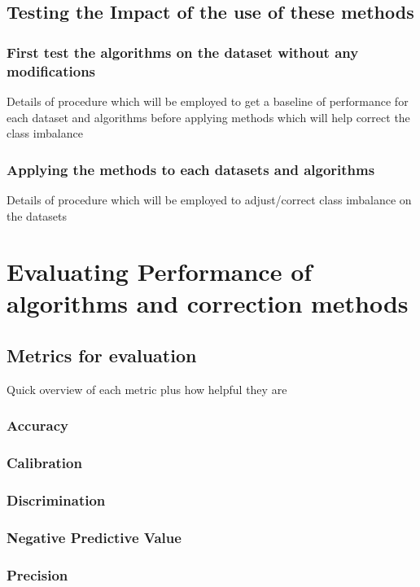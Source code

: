 \subsection{Testing the Impact of the use of these methods}
\subsubsection{First test the algorithms on the dataset without any modifications}
Details of procedure which will be employed to get a baseline of performance for each dataset and algorithms before applying methods which will help correct the class imbalance

\subsubsection{Applying the methods to each datasets and algorithms}
Details of procedure which will be employed to adjust/correct class imbalance on the datasets


\section{Evaluating Performance of algorithms and correction methods}

\subsection{Metrics for evaluation} %
Quick overview of each metric plus how helpful they are 
\subsubsection{Accuracy}
\subsubsection{Calibration}
\subsubsection{Discrimination}
\subsubsection{Negative Predictive Value}
\subsubsection{Precision}
